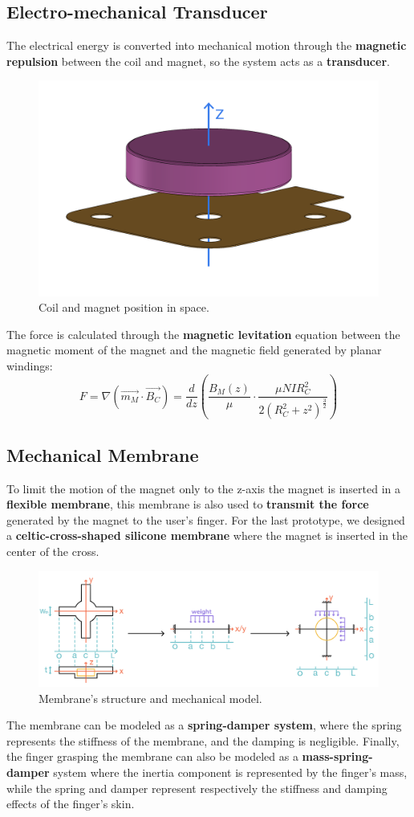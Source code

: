 \subsection{Electro-mechanical Transducer}
The electrical energy is converted into mechanical motion through the \textbf{magnetic repulsion} between the coil and magnet, so the system acts as a \textbf{transducer}.
\begin{figure}[H]
    \centering
    \includegraphics[width=0.4\columnwidth]{Figures/coil_magnet.png} 
    \caption[Coil-Magnet position]{Coil and magnet position in space.}
\end{figure}
The force is calculated through the \textbf{magnetic levitation} equation between the magnetic moment of the magnet and the magnetic field generated by planar windings:
\begin{equation*}
    F = \nabla (\overrightarrow{m_M} \cdot \overrightarrow{B_C}) = \frac{d}{dz} \left( \frac{B_M(z)}{\mu} \cdot \frac{\mu N I R_C^2}{2(R_C^2+z^2)^\frac{3}{2}} \right)
\end{equation*}

\subsection{Mechanical Membrane}
To limit the motion of the magnet only to the z-axis the magnet is inserted in a \textbf{flexible membrane}, this membrane is also used to \textbf{transmit the force} generated by the magnet to the user's finger.
For the last prototype, we designed a \textbf{celtic-cross-shaped silicone membrane} where the magnet is inserted in the center of the cross.
\begin{figure}[H]
    \centering
    \includegraphics[width=0.9\linewidth]{Figures/membr_mech_model.jpg} 
    \caption[Membrane structure]{Membrane's structure and mechanical model.}
\end{figure}
The membrane can be modeled as a \textbf{spring-damper system}, where the spring represents the stiffness of the membrane, and the damping is negligible.
Finally, the finger grasping the membrane can also be modeled as a \textbf{mass-spring-damper} system where the inertia component is represented by the finger's mass, while the spring and damper represent respectively the stiffness and damping effects of the finger's skin.
